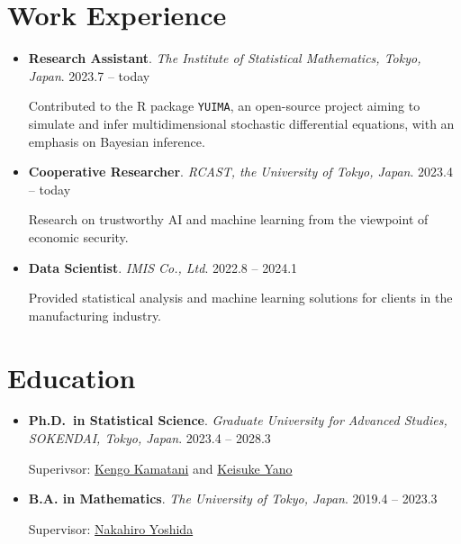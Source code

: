 \documentclass[
  11pt,
]{article}
\renewcommand{\labelitemi}{\textcolor{minty}{\faCheckCircle}} %
\begin{document}
\section{Work Experience}\label{work-experience}

\renewcommand{\labelitemi}{\textcolor{minty}{\faUniversity}}

\begin{itemize}
\item
  \textbf{Research Assistant}. \emph{The Institute of Statistical
  Mathematics, Tokyo, Japan}. \hfill {2023.7 -- today}

  Contributed to the R package \texttt{YUIMA}, an open-source project
  aiming to simulate and infer multidimensional stochastic differential
  equations, with an emphasis on Bayesian inference.
\item
  \textbf{Cooperative Researcher}. \emph{RCAST, the University of Tokyo,
  Japan}. \hfill {2023.4 -- today}

  Research on trustworthy AI and machine learning from the viewpoint of
  economic security.
\item
  \textbf{Data Scientist}. \emph{IMIS Co., Ltd}. \hfill {2022.8 --
  2024.1}

  Provided statistical analysis and machine learning solutions for
  clients in the manufacturing industry.
\end{itemize}

\section{Education}\label{education}

\renewcommand{\labelitemi}{\textcolor{minty}{\faGraduationCap}}

\begin{itemize}
\item
  \textbf{Ph.D.~in Statistical Science}. \emph{Graduate University for
  Advanced Studies, SOKENDAI, Tokyo, Japan}. \hfill {2023.4 -- 2028.3}

  Superivsor:
  \href{https://sites.google.com/view/kengokamatani/home}{Kengo
  Kamatani} and \href{https://sites.google.com/site/kyanostat/}{Keisuke
  Yano}
\item
  \textbf{B.A. in Mathematics}. \emph{The University of Tokyo, Japan}.
  \hfill {2019.4 -- 2023.3}

  Supervisor:
  \href{https://www.ms.u-tokyo.ac.jp/~nakahiro/hp-naka-e}{Nakahiro
  Yoshida}
\end{itemize}

\renewcommand{\labelitemi}{\textcolor{minty}{\faBookmark}}
\end{document}
